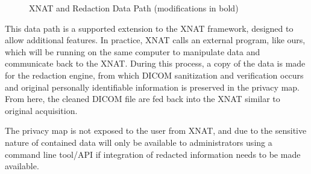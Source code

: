 \begin{figure}[hbt]
        \caption{\label{fig:dataworkflow} XNAT and Redaction Data Path (modifications in bold)}
\end{figure}

This data path is a supported extension to the XNAT framework, designed to allow additional features. In practice, XNAT calls an external program, like ours, which will be running on the same computer to manipulate data and communicate back to the XNAT. During this process, a copy of the data is made for the redaction engine, from which DICOM sanitization and verification occurs and original personally identifiable information is preserved in the privacy map. From here, the cleaned DICOM file are fed back into the XNAT similar to original acquisition.

The privacy map is not exposed to the user from XNAT, and due to the sensitive nature of contained data will only be available to administrators using a command line tool/API if integration of redacted information needs to be made available. 

